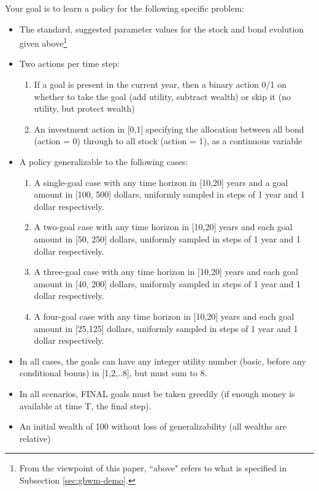 \documentclass[mnsc,sglanonrev]{informs4}
\begin{document}
\begin{APPENDICES}
Your goal is to learn a policy for the following specific problem:
\begin{itemize}
    \item The standard, suggested parameter values for the stock and bond evolution given above\footnote{From the viewpoint of this paper, ``above" refers to what is specified in Subsection \ref{sec:gbwm-demo}.}
    \item Two actions per time step:
        \begin{enumerate}
            \item If a goal is present in the current year, then a binary action 0/1 on whether to take the goal (add utility, subtract wealth) or skip it (no utility, but protect wealth)
            \item An investment action in [0,1] specifying the allocation between all bond (action = 0) through to all stock (action = 1), as a continuous variable
        \end{enumerate}
    \item A policy generalizable to the following cases:
        \begin{enumerate}
            \item A single-goal case with any time horizon in [10,20] years and a goal amount in [100, 500] dollars, uniformly sampled in steps of 1 year and 1 dollar respectively. 
            \item A two-goal case with any time horizon in [10,20] years and each goal amount in [50, 250] dollars, uniformly sampled in steps of 1 year and 1 dollar respectively.
            \item A three-goal case with any time horizon in [10,20] years and each goal amount in [40, 200] dollars, uniformly sampled in steps of 1 year and 1 dollar respectively.
            \item A four-goal case with any time horizon in [10,20] years and each goal amount in [25,125] dollars, uniformly sampled in steps of 1 year and 1 dollar respectively.
        \end{enumerate}
    \item In all cases, the goals can have any integer utility number (basic, before any conditional bonus) in [1,2,..8], but must sum to 8.
    \item In all scenarios, FINAL goals must be taken greedily (if enough money is available at time T, the final step).
    \item An initial wealth of 100 without loss of generalizability (all wealths are relative)

\end{itemize}
\end{APPENDICES}
\end{document}
